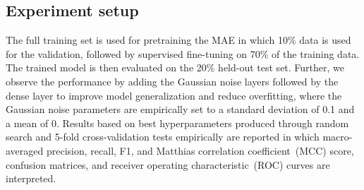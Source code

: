 \subsection{Experiment setup}
The full training set is used for pretraining the MAE in which 10\% data is used for the validation, followed by supervised fine-tuning on 70\% of the training data. The trained model is then evaluated on the 20\% held-out test set. Further, we observe the performance by adding the Gaussian noise layers followed by the dense layer to improve model generalization and reduce overfitting, where the Gaussian noise parameters are empirically set to a standard deviation of 0.1 and a mean of 0. Results based on best hyperparameters produced through random search and 5-fold cross-validation tests empirically are reported in which macro-averaged precision, recall, F1, and Matthias correlation coefficient~(MCC) score, confusion matrices, and receiver operating characteristic~(ROC) curves are interpreted.

